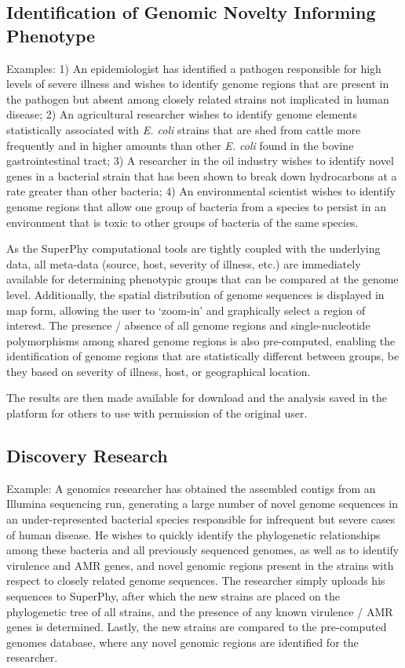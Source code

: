 \documentclass[a4paper,twoside]{article}
\begin{document}
{\subsection{Identification of Genomic Novelty Informing Phenotype}
Examples: 1) An epidemiologist has identified a pathogen responsible for high levels of severe illness and wishes to identify genome regions that are present in the pathogen but absent among closely related strains not implicated in human disease; 2) An agricultural researcher wishes to identify genome elements statistically associated with \textit{E. coli} strains that are shed from cattle more frequently and in higher amounts than other \textit{E. coli} found in the bovine gastrointestinal tract; 3) A researcher in the oil industry wishes to identify novel genes in a bacterial strain that has been shown to break down hydrocarbons at a rate greater than other bacteria; 4) An environmental scientist wishes to identify genome regions that allow one group of bacteria from a species to persist in an environment that is toxic to other groups of bacteria of the same species.

As the SuperPhy computational tools are tightly coupled with the underlying data, all meta-data (source, host, severity of illness, etc.) are immediately available for determining phenotypic groups that can be compared at the genome level. Additionally, the spatial distribution of genome sequences is displayed in map form, allowing the user to `zoom-in' and graphically select a region of interest. The presence / absence of all genome regions and single-nucleotide polymorphisms among shared genome regions is also pre-computed, enabling the identification of genome regions that are statistically different between groups, be they based on severity of illness, host, or geographical location.

The results are then made available for download and the analysis saved in the platform for others to use with permission of the original user.

\subsection{Discovery Research}
Example: A genomics researcher has obtained the assembled contigs from an Illumina sequencing run, generating a large number of novel genome sequences in an under-represented bacterial species responsible for infrequent but severe cases of human disease. He wishes to quickly identify the phylogenetic relationships among these bacteria and all previously sequenced genomes, as well as to identify virulence and AMR genes, and novel genomic regions present in the strains with respect to closely related genome sequences. The researcher simply uploads his sequences to SuperPhy, after which the new strains are placed on the phylogenetic tree of all strains, and the presence of any known virulence / AMR genes is determined. Lastly, the new strains are compared to the pre-computed genomes database, where any novel genomic regions are identified for the researcher.

}
\end{document}
